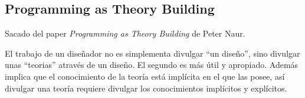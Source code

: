 \subsection{Programming as Theory Building}

Sacado del paper \emph{Programming as Theory Building} de Peter Naur. 

El trabajo de un dise\~nador no es simplementa divulgar ``un dise\~no'', sino divulgar unas ``teorias'' atrav\'es de un dise\~no. El segundo es m\'as \'util y apropiado. Adem\'as implica que el conocimiento de la teor\'ia est\'a impl\'icita en el que las posee, as\'i divulgar una teor\'ia requiere divulgar los conocimientos impl\'icitos y expl\'icitos. 